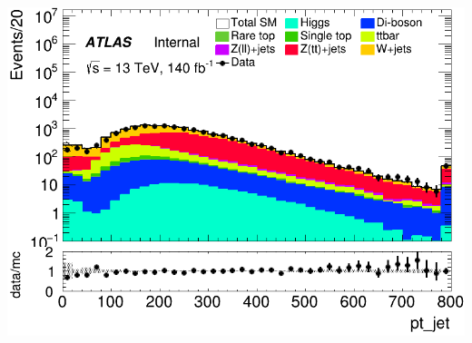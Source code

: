\documentclass[usenames,dvipsnames]{beamer}
\begin{document}
\begin{frame}
\begin{minipage}{0.32\textwidth}
        \centering
        \includegraphics[width=\textwidth]{graphics/HH_met/HH_met_pt_jet.png}
    \end{minipage}
    
    \vspace{0.5cm} %


\end{frame}
\end{document}

